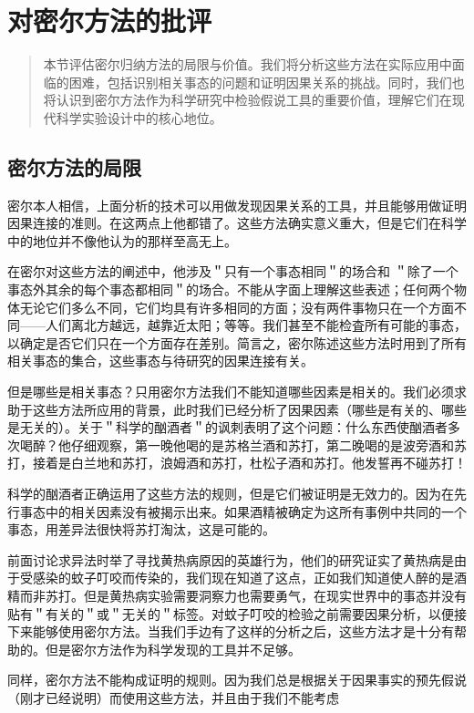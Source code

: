 \section{对密尔方法的批评}

\begin{quotation}
本节评估密尔归纳方法的局限与价值。我们将分析这些方法在实际应用中面临的困难，包括识别相关事态的问题和证明因果关系的挑战。同时，我们也将认识到密尔方法作为科学研究中检验假说工具的重要价值，理解它们在现代科学实验设计中的核心地位。
\end{quotation}

\subsection{密尔方法的局限}
密尔本人相信，上面分析的技术可以用做发现因果关系的工具，并且能够用做证明因果连接的准则。在这两点上他都错了。这些方法确实意义重大，但是它们在科学中的地位并不像他认为的那样至高无上。

在密尔对这些方法的阐述中，他涉及＂只有一个事态相同＂的场合和 ＂除了一个事态外其余的每个事态都相同＂的场合。不能从字面上理解这些表述；任何两个物体无论它们多么不同，它们均具有许多相同的方面；没有两件事物只在一个方面不同——人们离北方越远，越靠近太阳；等等。我们甚至不能检査所有可能的事态，以确定是否它们只在一个方面存在差别。简言之，密尔陈述这些方法时用到了所有相关事态的集合，这些事态与待研究的因果连接有关。

但是哪些是相关事态？只用密尔方法我们不能知道哪些因素是相关的。我们必须求助于这些方法所应用的背景，此时我们已经分析了因果因素（哪些是有关的、哪些是无关的）。关于＂科学的酗酒者＂的讽刺表明了这个问题：什么东西使酗酒者多次喝醉？他仔细观察，第一晚他喝的是苏格兰酒和苏打，第二晚喝的是波旁酒和苏打，接着是白兰地和苏打，浪姆酒和苏打，杜松子酒和苏打。他发誓再不碰苏打！

科学的酗酒者正确运用了这些方法的规则，但是它们被证明是无效力的。因为在先行事态中的相关因素没有被揭示出来。如果酒精被确定为这所有事例中共同的一个事态，用差异法很快将苏打淘汰，这是可能的。

前面讨论求异法时举了寻找黄热病原因的英雄行为，他们的研究证实了黄热病是由于受感染的蚊子叮咬而传染的，我们现在知道了这点，正如我们知道使人醉的是酒精而非苏打。但是黄热病实验需要洞察力也需要勇气，在现实世界中的事态并没有贴有＂有关的＂或＂无关的＂标签。对蚊子叮咬的检验之前需要因果分析，以便接下来能够使用密尔方法。当我们手边有了这样的分析之后，这些方法才是十分有帮助的。但是密尔方法作为科学发现的工具并不足够。

同样，密尔方法不能构成证明的规则。因为我们总是根据关于因果事实的预先假说（刚才已经说明）而使用这些方法，并且由于我们不能考虑

